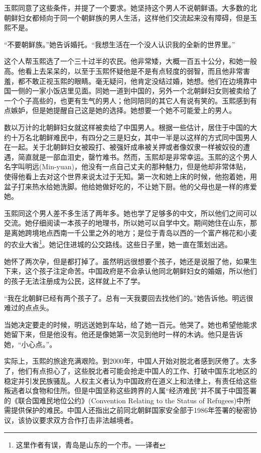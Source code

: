 玉熙同意了这些条件，并提了一个要求。她坚持这个男人不说朝鲜语。大多数的北朝鲜妇女都倾向于同一个朝鲜族的男人生活，这样他们交流起来没有障碍，但是玉熙不是。

“不要朝鲜族。”她告诉婚托。“我想生活在一个没人认识我的全新的世界里。”

这个人帮玉熙选了一个三十过半的农民。他非常矮，大概一百五十公分，和她一般高。他看上去呆呆的，以至于玉熙怀疑他是不是有点轻度的弱智，而且他非常害羞，都不敢正视玉熙的眼睛。毫无疑问，他肯定没结过婚，她想。他们在边境靠中国一侧的一家小饭店里见面。同她一道到中国的，另外一个北朝鲜妇女则被卖给了一个个子高些的，也更有生气的男人；他同陪同的其它人有说有笑的。玉熙感到有点嫉妒，但是她提醒自己这是她的选择。她想要一个她不可能爱上的男人。

数以万计的北朝鲜妇女就这样被卖给了中国男人。根据一些估计，居住于中国的大约十万名北朝鲜难民中，有四分之三是妇女，其中一半是以这样的方式同中国男人在一起。关于北朝鲜妇女被殴打、被强奸成串被关押或者像奴隶一样被奴役的遭遇，简直就是一部血泪史，罄竹难书。然而，玉熙却是非常幸运。玉熙的这个男人名字叫明远(Min-yuan)，他没有一点自己丈夫的那种魅力，但是他却非常体贴，使得他看上去对这个世界来说太过于无知。第一次和她上床的时候，他抱着她，用盆子打来热水给她洗脚。他给她做好吃的，不让她下厨。他的父母也是一样的疼爱她。

玉熙同这个男人差不多生活了两年多。她也学了足够多的中文，所以他们之间可以交流。她仔细阅读一本孩子的地理书，所以她可以自学中文。期间她住在山东，那是离她跨境地点西南一千公里之外的地方；是位于青岛以西的一个富产棉花和小麦的农业大省\footnote{这里作者有误，青岛是山东的一个市。──译者}。她记住进城的公交路线。这些日子里，她一直在策划出逃。

她怀了两次孕，但是都打掉了。虽然明远很想要个孩子，她还是说服了他，如果生下来，这个孩子注定命苦。中国政府是不会承认他同北朝鲜妇女的婚姻，所以他们的孩子无法注册成为公民，这样就上不了学。

“我在北朝鲜已经有两个孩子了。总有一天我要回去找他们的。”她告诉他。明远很难过的点点头。

当她决定要走的时候，明远送她到车站，给了她一百元。他哭了。她也希望他能求她留下来，但是他没有。他还是像她第一次见到他时一样的木讷。他只是告诉她，“小心点。”。

实际上，玉熙的旅途充满艰险。到2000年，中国人开始对脱北者感到厌倦了。太多了，他们有点担心了，这些脱北者可能会抢走中国人的工作、打破中国东北地区的稳定并引发民族骚乱。人权主义者认为中国政府在道义上和法律上，有责任给这些叛逃者以食物和住所。但是中国坚称这些跨界的人属“经济难民”并不属于中国签署的《联合国难民地位公约》(Convention Relating to the Status of Refugees)中所需提供保护的难民。中国人还指出之前同北朝鲜国家安全部于1986年签署的秘密协议，该协议要求双方合作打击非法越境者。

